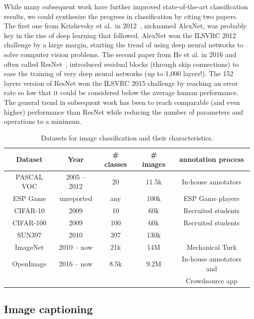 While many subsequent work have further improved state-of-the-art classification results,
we could synthesize the progress in classification by citing two papers.
The first one from Krizhevsky et al.\ in 2012~\cite{krizhevsky2012imagenet},
nicknamed AlexNet, was probably key in the rise of deep learning that followed.
AlexNet won the ILSVRC 2012 challenge by a large margin,
starting the trend of using deep neural networks to solve computer vision problems.
The second paper from He et al. in 2016 and often called ResNet~\cite{he2016deep},
introduced residual blocks (through skip connections)
to ease the training of very deep neural networks (up to 1,000 layers!).
The 152 layers version of ResNet won the ILSVRC 2015 challenge
by reaching an error rate so low that
it could be considered below the average human performance.
The general trend in subsequent work has been to reach comparable
(and even higher) performance than ResNet while
reducing the number of parameters and operations to a minimum.

\vspace{0.5cm}
\begin{table}
	\centering
	\caption{Datasets for image classification and their characteristics.}
	\begin{tabular}{|c|c|c|c|c|}
		\hline
		Dataset & Year & \# classes & \# images &  annotation process \\
		\hline
		PASCAL VOC \cite{Everingham10} & 2005 -- 2012 & 20 & 11.5k &  In-house annotators \\
		ESP Game \cite{von2005esp} & unreported & any & 100k &  ESP Game players \\
		CIFAR-10 \cite{krizhevsky2009learning} & 2009 & 10 & 60k  & Recruited students \\
		CIFAR-100 \cite{krizhevsky2009learning} & 2009 & 100 & 60k  & Recruited students \\
		SUN397 \cite{xiao2010sun} & 2010 & 397 & 130k &   \\
		ImageNet \cite{ILSVRC15} & 2010 -- now & 21k & 14M &  Mechanical Turk \\
		OpenImage \cite{OpenImages, OpenImages2} & 2016 -- now & 8.5k & 9.2M &  In-house annotators and \\
& & & & Crowdsource app\\
		\hline
	\end{tabular}
	\label{tab:classification_ds}
\end{table}
\vspace{0.5cm}

\subsection{Image captioning}

